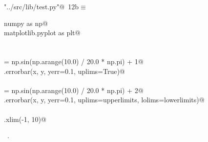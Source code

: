 \documentclass[12pt]{report}
\begin{document}
\begin{flushleft} \small
\begin{minipage}{\linewidth}\label{scrap3}\raggedright\small
{} \verb@"../src/lib/test.py"@\nobreak\ {\footnotesize {12b}}$\equiv$
\vspace{-1ex}
\begin{list}{}{} \item
\mbox{}\verb@import numpy as np@\\
\mbox{}\verb@import matplotlib.pyplot as plt@\\
\mbox{}\verb@@\\
\mbox{}\verb@@\\
\mbox{}\verb@y = np.sin(np.arange(10.0) / 20.0 * np.pi) + 1@\\
\mbox{}\verb@plt.errorbar(x, y, yerr=0.1, uplims=True)@\\
\mbox{}\verb@@\\
\mbox{}\verb@y = np.sin(np.arange(10.0) / 20.0 * np.pi) + 2@\\
\mbox{}\verb@plt.errorbar(x, y, yerr=0.1, uplims=upperlimits, lolims=lowerlimits)@\\
\mbox{}\verb@@\\
\mbox{}\verb@plt.xlim(-1, 10)@\\
\mbox{}\verb@@{\NWsep}
\end{list}
\vspace{-1.5ex}
\footnotesize
\begin{list}{}{\setlength{\itemsep}{-\parsep}\setlength{\itemindent}{-\leftmargin}}
\item \NWtxtFileDefBy\ .

\item{}
\end{list}
\end{minipage}\vspace{4ex}
\end{flushleft}
\newchunk \blindtext
\end{document}
